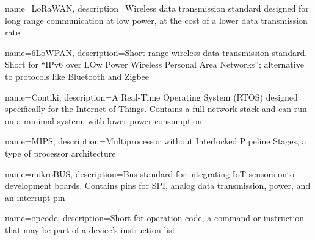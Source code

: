\makeglossaries

{
  name=LoRaWAN,
  description={Wireless data transmission standard designed for long range communication at low power, at the cost of a lower data transmission rate}
}

{
  name=6LoWPAN,
  description={Short-range wireless data transmission standard. Short for ``IPv6 over LOw Power Wireless Personal Area Networks''; alternative to protocols like Bluetooth and Zigbee}
}

{
  name={Contiki},
  description={A Real-Time Operating System (RTOS) designed specifically for the Internet of Things. Contains a full network stack and can run on a minimal system, with lower power consumption}
}

{
  name={MIPS},
  description={Multiprocessor without Interlocked Pipeline Stages, a type of
  processor architecture}
}

{
  name={mikroBUS},
  description={Bus standard for integrating IoT sensors onto
  development boards. Contains pins for SPI, analog data transmission, power,
  and an interrupt pin}
}

{
  name={opcode},
  description={Short for operation code, a command or instruction that may be part of a device's instruction list}
}